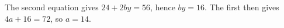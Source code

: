 The second equation gives $24+2by=56$, hence $by=16$. The first then gives $4a+16=72$, so $\boxed{a=14}$.
